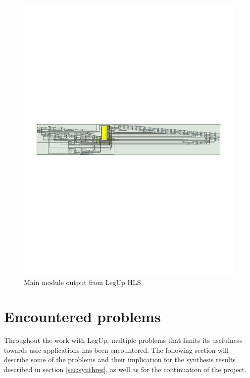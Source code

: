 \begin{figure}[hbpt]
\centering
\includegraphics[width=\textwidth]{../figs/LegUpOutputMain.pdf}
\caption{\label{fig:legupoumain}Main module output from LegUp HLS}
\end{figure}

\section{\label{sec:encprob}Encountered problems}
Throughout the work with LegUp, multiple problems that limits its usefulness towards \gls{asic}-applications has been encountered. The following section will describe some of the problems and their implication for the synthesis results described in section \ref{sec:synthres}, as well as for the continuation of the project.
